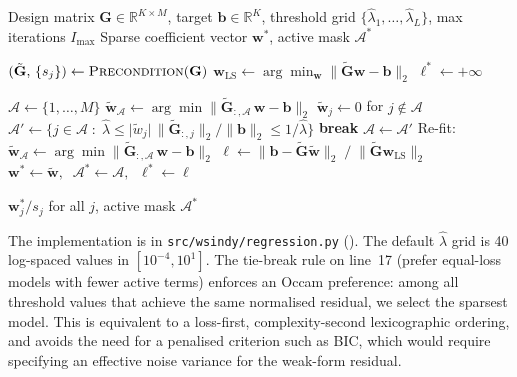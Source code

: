 \begin{breakablealgorithm}
\caption{MSTLS with dominant-balance thresholding}
\label{alg:mstls}
{\footnotesize
\begin{algorithmic}[1]
\Require Design matrix $\mathbf{G}\in\mathbb{R}^{K\times M}$, target $\mathbf{b}\in\mathbb{R}^K$, threshold grid $\{\hat\lambda_1,\dots,\hat\lambda_L\}$, max iterations $I_{\max}$
\Ensure Sparse coefficient vector $\mathbf{w}^*$, active mask $\mathcal{A}^*$

\State $(\tilde{\mathbf{G}},\,\{s_j\}) \gets \textsc{Precondition}(\mathbf{G})$
\State $\mathbf{w}_{\mathrm{LS}} \gets \arg\min_{\mathbf{w}} \lVert \tilde{\mathbf{G}}\mathbf{w} - \mathbf{b}\rVert_2$
\State $\ell^* \gets +\infty$

  \State $\mathcal{A} \gets \{1,\dots,M\}$
    \State $\tilde{\mathbf{w}}_\mathcal{A} \gets \arg\min \lVert \tilde{\mathbf{G}}_{:,\mathcal{A}}\,\mathbf{w} - \mathbf{b}\rVert_2$
    \State $\tilde{\mathbf{w}}_j \gets 0$ for $j \notin \mathcal{A}$
    \State $\mathcal{A}' \gets \bigl\{j \in \mathcal{A} \;:\; \hat\lambda \le \lvert\tilde w_j\rvert\,\lVert\tilde{\mathbf{G}}_{:,j}\rVert_2 / \lVert\mathbf{b}\rVert_2 \le 1/\hat\lambda\bigr\}$
      \State \textbf{break}
    \EndIf
    \State $\mathcal{A} \gets \mathcal{A}'$
  \EndFor
  \State Re-fit: $\tilde{\mathbf{w}}_\mathcal{A} \gets \arg\min \lVert \tilde{\mathbf{G}}_{:,\mathcal{A}}\,\mathbf{w} - \mathbf{b}\rVert_2$
  \State $\ell \gets \lVert\mathbf{b} - \tilde{\mathbf{G}}\tilde{\mathbf{w}}\rVert_2 \;/\; \lVert\tilde{\mathbf{G}}\mathbf{w}_{\mathrm{LS}}\rVert_2$
    \State $\mathbf{w}^* \gets \tilde{\mathbf{w}},\;\;\mathcal{A}^* \gets \mathcal{A},\;\;\ell^* \gets \ell$
  \EndIf
\EndFor

\State \Return $\mathbf{w}^*_j / s_j$ for all $j$, active mask $\mathcal{A}^*$
\end{algorithmic}
}
\end{breakablealgorithm}

\noindent The implementation is in \texttt{src/wsindy/regression.py} ().
The default $\hat\lambda$ grid is 40 log-spaced values in $[10^{-4},10^1]$.
The tie-break rule on line~17 (prefer equal-loss models with fewer
active terms) enforces an Occam preference: among all threshold values
that achieve the same normalised residual, we select the sparsest
model.  This is equivalent to a loss-first, complexity-second
lexicographic ordering, and avoids the need for a penalised
criterion such as BIC, which would require specifying an effective
noise variance for the weak-form residual.

